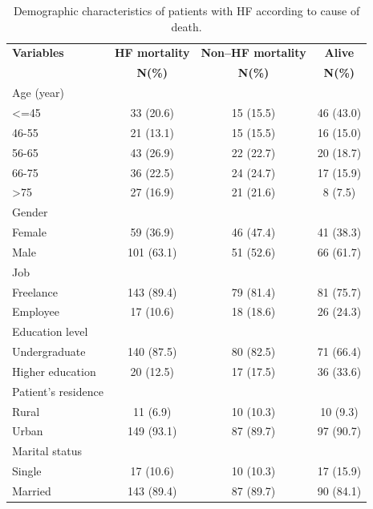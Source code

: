 \documentclass[twoside]{article}
\begin{document}
\begin{table}[h]
\begin{center}
\small
\caption{Demographic characteristics of patients with HF according to cause of death.}\label{tab1}
\begin{tabular}{|l|c|c|c|}
  \hline
  \textbf{Variables} & \textbf{HF mortality} & \textbf{Non--HF mortality} & \textbf{Alive} \\
                     & \textbf{N(\%)}        & \textbf{N(\%)}            & \textbf{N(\%)} \\ \hline \hline
  Age (year) & & & \\
  \hspace{2mm} <=45   & 33 (20.6) & 15 (15.5) & 46 (43.0) \\
  \hspace{2mm} 46-55  & 21 (13.1) & 15 (15.5) & 16 (15.0) \\
  \hspace{2mm} 56-65  & 43 (26.9) & 22 (22.7) & 20 (18.7) \\
  \hspace{2mm} 66-75  & 36 (22.5) & 24 (24.7) & 17 (15.9) \\
  \hspace{2mm} >75    & 27 (16.9) & 21 (21.6) & 8 (7.5) \\ \hline
  Gender & & & \\
  \hspace{2mm} Female & 59 (36.9) & 46 (47.4) & 41 (38.3) \\
  \hspace{2mm} Male   & 101 (63.1) & 51 (52.6) & 66 (61.7) \\ \hline
  Job & & & \\
  \hspace{2mm} Freelance & 143 (89.4) & 79 (81.4) & 81 (75.7) \\
  \hspace{2mm} Employee   & 17 (10.6) & 18 (18.6) & 26 (24.3) \\ \hline
  Education level & & & \\
  \hspace{2mm} Undergraduate   & 140 (87.5) & 80 (82.5) & 71 (66.4) \\
  \hspace{2mm} Higher education & 20 (12.5) & 17 (17.5) & 36 (33.6) \\ \hline
  Patient's residence & & & \\
  \hspace{2mm} Rural & 11 (6.9) & 10 (10.3) & 10 (9.3) \\
  \hspace{2mm} Urban & 149 (93.1) & 87 (89.7) & 97 (90.7) \\ \hline
  Marital status & & & \\
  \hspace{2mm} Single  & 17 (10.6) & 10 (10.3) & 17 (15.9) \\
  \hspace{2mm} Married & 143 (89.4) & 87 (89.7) & 90 (84.1) \\ \hline
\end{tabular}
\end{center}
\end{table}
\end{document}
